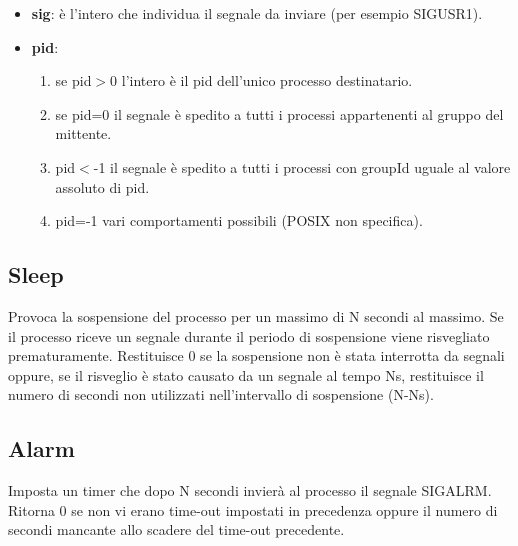 \documentclass{article}
\begin{document}
\begin{itemize}
    \item \textbf{sig}: è l'intero che individua il segnale da 
    inviare (per esempio SIGUSR1).
    \item \textbf{pid}: \begin{enumerate}
        \item se pid$>$0 l'intero è il pid dell'unico processo 
        destinatario.
        \item se pid=0 il segnale è spedito a tutti i
         processi appartenenti al gruppo del mittente.
        \item pid$<$-1 il segnale è spedito a tutti i processi con
         groupId uguale al valore assoluto di pid.
        \item pid=-1 vari comportamenti possibili 
        (POSIX non specifica).
    \end{enumerate}
\end{itemize}

\subsection{Sleep}

\noindent {}
\medskip

\noindent Provoca la sospensione del processo per un massimo di
 N secondi al massimo. Se il processo riceve un segnale
 durante il periodo di sospensione viene risvegliato
 prematuramente.
 Restituisce 0 se la sospensione non è stata interrotta da
 segnali oppure, se il risveglio è stato causato da un segnale al 
tempo Ns, restituisce il numero di secondi non 
utilizzati nell'intervallo di sospensione (N-Ns).

\subsection{Alarm}
\noindent {}
\medskip

\noindent Imposta un timer che dopo N secondi invierà al processo il 
segnale SIGALRM. Ritorna 0 se non vi erano time-out impostati
 in precedenza oppure il numero di secondi mancante allo scadere 
 del time-out precedente.
\end{document}

